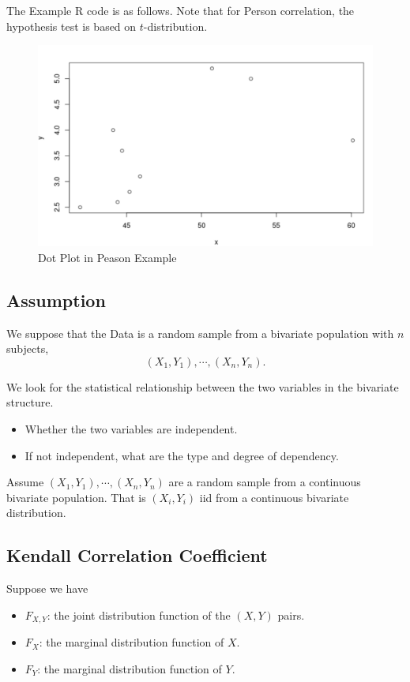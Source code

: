 The Example R code is as follows. Note that for Person correlation, the hypothesis test is based on $t$-distribution.




\begin{figure}[H]
	\centering
	\includegraphics[width=0.7\linewidth]{fig/pearson}
	\caption{Dot Plot in Peason Example}
	\label{fig:pearson}
\end{figure}


\subsection{Assumption}
We suppose that the Data is a random sample from a bivariate population with $n$ subjects,
\[(X_1, Y_1), \cdots, (X_n, Y_n).\]

We look for the statistical relationship between the two variables in the bivariate structure.
\begin{itemize}
	\item Whether the two variables are independent.
	\item If not independent, what are the type and degree of dependency.
\end{itemize}

Assume $(X_1, Y_1), \cdots, (X_n, Y_n)$ are a random sample from a continuous bivariate population. That is $(X_i, Y_i)$ iid from a continuous bivariate distribution.

\subsection{Kendall Correlation Coefficient}
Suppose we have
\begin{itemize}
	\item $F_{X,Y}$: the joint distribution function of the $(X, Y)$ pairs.
	\item $F_X$: the marginal distribution function of $X$.
	\item $F_Y$: the marginal distribution function of $Y$.
\end{itemize}

